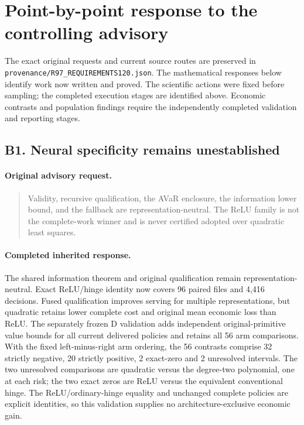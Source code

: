 \section{Point-by-point response to the controlling advisory}
The exact original requests and current source routes are preserved in
\nolinkurl{provenance/R97_REQUIREMENTS120.json}. The mathematical responses
below identify work now written and proved. The scientific actions were
fixed before sampling; the completed execution stages are identified above.
Economic contrasts and population findings require the independently
completed validation and reporting stages.

\subsection{B1. Neural specificity remains unestablished}
\label{response120:B1}
\paragraph{Original advisory request.}
\begin{quote}
Validity, recursive qualification, the AVaR enclosure, the information lower bound, and the fallback are representation-neutral. The ReLU family is not the complete-work winner and is never certified adopted over quadratic least squares.
\end{quote}
\paragraph{Completed inherited response.}
The shared information theorem and original qualification remain representation-neutral. Exact ReLU/hinge identity now covers 96 paired files and 4,416 decisions. Fused qualification improves serving for multiple representations, but quadratic retains lower complete cost and original mean economic loss than ReLU. The separately frozen D validation adds independent original-primitive value bounds for all current delivered policies and retains all 56 arm comparisons. With the fixed left-minus-right arm ordering, the 56 contrasts comprise 32 strictly negative, 20 strictly positive, 2 exact-zero and 2 unresolved intervals. The two unresolved comparisons are quadratic versus the degree-two polynomial, one at each risk; the two exact zeros are ReLU versus the equivalent conventional hinge. The ReLU/ordinary-hinge equality and unchanged complete policies are explicit identities, so this validation supplies no architecture-exclusive economic gain.
